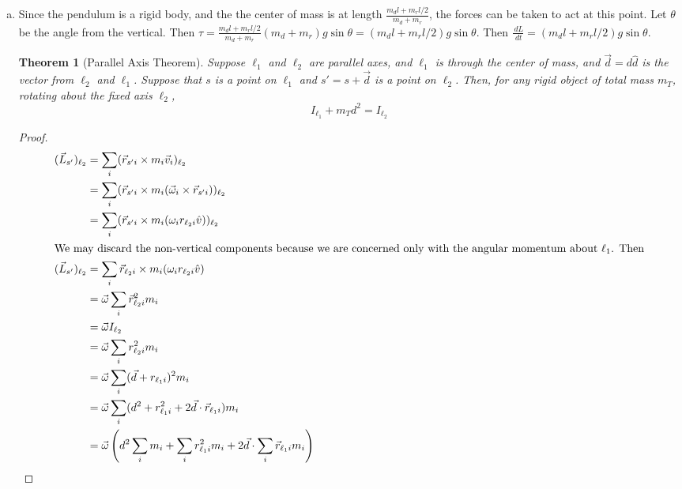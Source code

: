 \documentclass{esg8012pset}
\renewcommand{\d}{\,d}
\newtheorem{thm}{Theorem}[section]
\begin{document}
\begin{solution}
  \begin{enumerate}[(a)]
    \item Since the pendulum is a rigid body, and the the center of mass is at length $\frac{m_d l + m_r l / 2}{m_d + m_r}$, the forces can be taken to act at this point.  Let $\theta$ be the angle from the vertical.  Then $\tau = \frac{m_d l + m_r l / 2}{m_d + m_r} (m_d + m_r)g\sin\theta = (m_d l + m_r l / 2)g\sin\theta$.  Then $\frac{\d L}{\d t} = (m_d l + m_r l / 2)g\sin\theta$.
    \begin{thm}[Parallel Axis Theorem]
    Suppose $\ell_1$ and $\ell_2$ are parallel axes, and $\ell_1$ is through the center of mass, and $\vec d = d\hat d$ is the vector from $\ell_2$ and $\ell_1$.  Suppose that $s$ is a point on $\ell_1$ and $s' = s + \vec d$ is a point on $\ell_2$.  Then, for any rigid object of total mass $m_T$, rotating about the fixed axis $\ell_2$, \begin{equation} I_{\ell_1} + m_T d^2 = I_{\ell_2} \end{equation}
    \end{thm}
    \begin{proof}
      \begin{align*}
        (\vec L_{s'})_{\ell_2} & = \sum_i (\vec r_{s'i} \times m_i\vec v_i)_{\ell_2} \\
        & = \sum_i (\vec r_{s'i} \times m_i(\vec \omega_i \times \vec r_{s'i}))_{\ell_2} \\
        & = \sum_i (\vec r_{s'i} \times m_i(\omega_i r_{\ell_2 i} \hat v))_{\ell_2} \\
  \intertext{We may discard the non-vertical components because we are concerned only with the angular momentum about $\ell_1$.  Then}
        (\vec L_{s'})_{\ell_2} & = \sum_i \vec r_{\ell_2 i} \times m_i(\omega_i r_{\ell_2 i} \hat v) \\
        & = \vec \omega \sum_i \vec r_{\ell_2 i}^2 m_i \\
        & = \vec \omega I_{\ell_2} \\
        & = \vec \omega \sum_i r_{\ell_2 i}^2 m_i \\
        & = \vec \omega \sum_i (\vec d + r_{\ell_1 i})^2 m_i \\
        & = \vec \omega \sum_i (d^2 + r_{\ell_1 i}^2 + 2\vec d \cdot \vec r_{\ell_1 i}) m_i \\
        & = \vec \omega \left( d^2 \sum_i m_i +  \sum_i r_{\ell_1 i}^2 m_i + 2\vec d \cdot \sum_i \vec r_{\ell_1 i} m_i \right) \\

\end{align*}
\end{proof}
\end{enumerate}
\end{solution}
\end{document}

